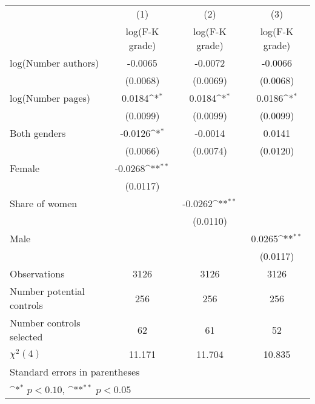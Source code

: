 {
\def\sym#1{\ifmmode^{#1}\else\(^{#1}\)\fi}
\begin{tabular}{l*{3}{c}}
\hline\hline
                    &\multicolumn{1}{c}{(1)}&\multicolumn{1}{c}{(2)}&\multicolumn{1}{c}{(3)}\\
                    &\multicolumn{1}{c}{log(F-K grade)}&\multicolumn{1}{c}{log(F-K grade)}&\multicolumn{1}{c}{log(F-K grade)}\\
\hline
\hspace{3mm}log(Number authors)&     -0.0065        &     -0.0072        &     -0.0066        \\
                    &    (0.0068)        &    (0.0069)        &    (0.0068)        \\
[1em]
\hspace{3mm}log(Number pages)&      0.0184\sym{*} &      0.0184\sym{*} &      0.0186\sym{*} \\
                    &    (0.0099)        &    (0.0099)        &    (0.0099)        \\
[1em]
\hspace{3mm}Both genders&     -0.0126\sym{*} &     -0.0014        &      0.0141        \\
                    &    (0.0066)        &    (0.0074)        &    (0.0120)        \\
[1em]
\hspace{3mm}Female  &     -0.0268\sym{**}&                    &                    \\
                    &    (0.0117)        &                    &                    \\
[1em]
\hspace{3mm}Share of women&                    &     -0.0262\sym{**}&                    \\
                    &                    &    (0.0110)        &                    \\
[1em]
\hspace{3mm}Male    &                    &                    &      0.0265\sym{**}\\
                    &                    &                    &    (0.0117)        \\
\hline
Observations        &        3126        &        3126        &        3126        \\
Number potential controls&         256        &         256        &         256        \\
Number controls selected&          62        &          61        &          52        \\
$\chi^2(4)$         &      11.171        &      11.704        &      10.835        \\
\hline\hline
\multicolumn{4}{l}{\footnotesize Standard errors in parentheses}\\
\multicolumn{4}{l}{\footnotesize \sym{*} \(p<0.10\), \sym{**} \(p<0.05\)}\\
\end{tabular}
}
